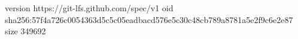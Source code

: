 version https://git-lfs.github.com/spec/v1
oid sha256:57f4a726c0054363d5c5c05eadbacd576e5c30c48cb789a8781a5e2f9c6e2e87
size 349692

